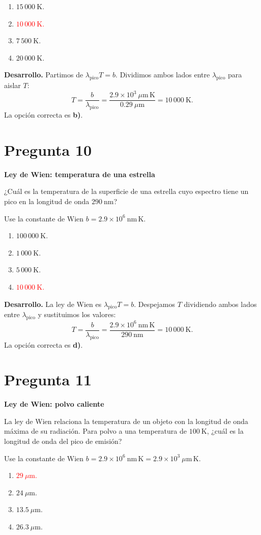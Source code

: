 \documentclass[a4paper,11pt]{article}
\newcommand{\pregunta}[2]{\section*{Pregunta #1}\textbf{#2}\par}
\begin{document}
\begin{enumerate}
    \item $15\,000\ \mathrm{K}$.
    \item \textcolor{red}{$10\,000\ \mathrm{K}$.}
    \item $7\,500\ \mathrm{K}$.
    \item $20\,000\ \mathrm{K}$.
\end{enumerate}

\textbf{Desarrollo.} Partimos de $\lambda_{\mathrm{pico}}T=b$. Dividimos ambos lados entre $\lambda_{\mathrm{pico}}$ para aislar $T$:
\[
T=\frac{b}{\lambda_{\mathrm{pico}}}
=\frac{2.9\times10^3\ \mu\mathrm{m\,K}}{0.29\ \mu\mathrm{m}}
=10\,000\ \mathrm{K}.
\]
La opción correcta es \textbf{b)}. \parencite[Sec. 9.4, p. 286]{chaparro2026}

\pregunta{10}{Ley de Wien: temperatura de una estrella}

¿Cuál es la temperatura de la superficie de una estrella cuyo espectro tiene un pico en la longitud de onda $290\ \mathrm{nm}$?

Use la constante de Wien $b=2.9\times10^6\ \mathrm{nm\,K}$.

\begin{enumerate}
    \item $100\,000\ \mathrm{K}$.
    \item $1\,000\ \mathrm{K}$.
    \item $5\,000\ \mathrm{K}$.
    \item \textcolor{red}{$10\,000\ \mathrm{K}$.}
\end{enumerate}

\textbf{Desarrollo.} La ley de Wien es $\lambda_{\mathrm{pico}}T=b$. Despejamos $T$ dividiendo ambos lados entre $\lambda_{\mathrm{pico}}$ y sustituimos los valores:
\[
T=\frac{b}{\lambda_{\mathrm{pico}}}
=\frac{2.9\times10^6\ \mathrm{nm\,K}}{290\ \mathrm{nm}}
=10\,000\ \mathrm{K}.
\]
La opción correcta es \textbf{d)}. \parencite[Sec. 9.4, p. 286]{chaparro2026}

\pregunta{11}{Ley de Wien: polvo caliente}

La ley de Wien relaciona la temperatura de un objeto con la longitud de onda máxima de su radiación. Para polvo a una temperatura de $100\ \mathrm{K}$, ¿cuál es la longitud de onda del pico de emisión?

Use la constante de Wien $b=2.9\times10^6\ \mathrm{nm\,K}=2.9\times10^3\ \mu\mathrm{m\,K}$.

\begin{enumerate}
    \item \textcolor{red}{$29\ \mu\mathrm{m}$.}
    \item $24\ \mu\mathrm{m}$.
    \item $13.5\ \mu\mathrm{m}$.
    \item $26.3\ \mu\mathrm{m}$.
\end{enumerate}
\end{document}
